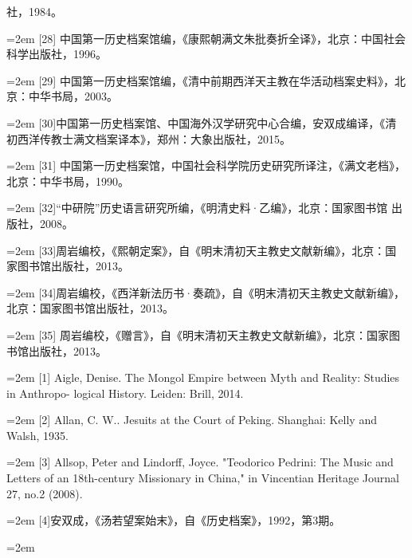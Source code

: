 社，1984。%
\par
\noindent\hangindent=2em
[28] 中国第一历史档案馆编，《康熙朝满文朱批奏折全译》，北京：中国社会%
科学出版社，1996。%
\par
\noindent\hangindent=2em
[29] 中国第一历史档案馆编，《清中前期西洋天主教在华活动档案史料》，北%
京：中华书局，2003。%
\par
\noindent\hangindent=2em
[30]中国第一历史档案馆、中国海外汉学研究中心合编，安双成编译，《清%
初西洋传教士满文档案译本》，郑州：大象出版社，2015。%
\par
\noindent\hangindent=2em
[31] 中国第一历史档案馆，中国社会科学院历史研究所译注，《满文老档》，%
北京：中华书局，1990。%
\par
\noindent\hangindent=2em
[32]“中研院”历史语言研究所编，《明清史料·乙编》，北京：国家图书馆%
出版社，2008。%
\par
\noindent\hangindent=2em
[33]周岩编校，《熙朝定案》，自《明末清初天主教史文献新编》，北京：国%
家图书馆出版社，2013。%
\par
\noindent\hangindent=2em
[34]周岩编校，《西洋新法历书·奏疏》，自《明末清初天主教史文献新编》，%
北京：国家图书馆出版社，2013。%
\par
\noindent\hangindent=2em
[35] 周岩编校，《赠言》，自《明末清初天主教史文献新编》，北京：国家图%
书馆出版社，2013。%
\par
\noindent\hangindent=2em
[1] Aigle, Denise. The Mongol Empire between Myth and Reality: Studies in Anthropo-%
logical History. Leiden: Brill, 2014.%
\par
\noindent\hangindent=2em
[2] Allan, C. W.. Jesuits at the Court of Peking. Shanghai: Kelly and Walsh, 1935.%
\par
\noindent\hangindent=2em
[3] Allsop, Peter and Lindorff, Joyce. "Teodorico Pedrini: The Music and Letters of%
\space%
an 18th-century Missionary in China," in Vincentian Heritage Journal 27, no.2%
(2008).%
\par
\noindent\hangindent=2em
[4]安双成，《汤若望案始末》，自《历史档案》，1992，第3期。%
\par
\noindent\hangindent=2em
